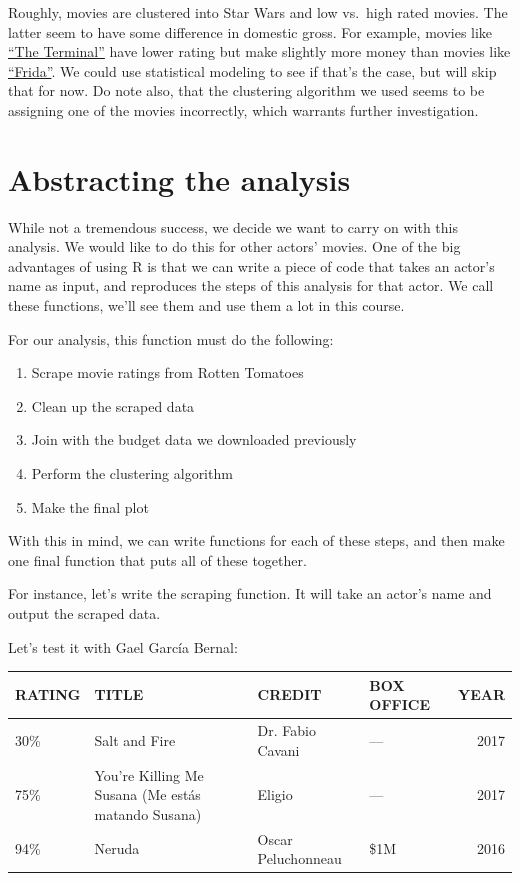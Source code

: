 \documentclass[12pt,]{book}
\providecommand{\tightlist}{%
  \setlength{\itemsep}{0pt}\setlength{\parskip}{0pt}}
\theoremstyle{definition}
\theoremstyle{definition}
\theoremstyle{remark}
\begin{document}
Roughly, movies are clustered into Star Wars and low vs.~high rated
movies. The latter seem to have some difference in domestic gross. For
example, movies like
\href{https://www.rottentomatoes.com/m/1133499_1133499_terminal}{``The
Terminal''} have lower rating but make slightly more money than movies
like \href{https://www.rottentomatoes.com/m/frida}{``Frida''}. We could
use statistical modeling to see if that's the case, but will skip that
for now. Do note also, that the clustering algorithm we used seems to be
assigning one of the movies incorrectly, which warrants further
investigation.

\section{Abstracting the analysis}\label{abstracting-the-analysis}

While not a tremendous success, we decide we want to carry on with this
analysis. We would like to do this for other actors' movies. One of the
big advantages of using R is that we can write a piece of code that
takes an actor's name as input, and reproduces the steps of this
analysis for that actor. We call these functions, we'll see them and use
them a lot in this course.

For our analysis, this function must do the following:

\begin{enumerate}
\def\labelenumi{\arabic{enumi}.}
\tightlist
\item
  Scrape movie ratings from Rotten Tomatoes
\item
  Clean up the scraped data
\item
  Join with the budget data we downloaded previously
\item
  Perform the clustering algorithm
\item
  Make the final plot
\end{enumerate}

With this in mind, we can write functions for each of these steps, and
then make one final function that puts all of these together.

For instance, let's write the scraping function. It will take an actor's
name and output the scraped data.

Let's test it with Gael García Bernal:

\begin{tabular}{l|l|l|l|r}
\hline
RATING & TITLE & CREDIT & BOX OFFICE & YEAR\\
\hline
30\% & Salt and Fire & Dr. Fabio Cavani & — & 2017\\
\hline
75\% & You're Killing Me Susana (Me estás matando Susana) & Eligio & — & 2017\\
\hline
94\% & Neruda & Oscar Peluchonneau & \$1M & 2016\\
\hline
\end{tabular}
\end{document}

